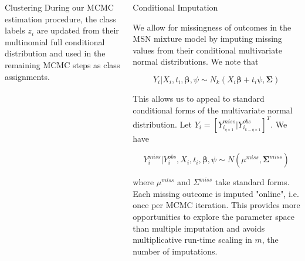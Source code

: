 \documentclass[final]{beamer}
\newlength{\onecolwid}
\newlength{\twocolwid}
\begin{document}
\begin{frame}[t]
\begin{columns}[t]
\begin{column}{\twocolwid}
\begin{columns}[t,totalwidth=\twocolwid]
\begin{column}{\onecolwid}
\begin{block}{Clustering}
During our MCMC estimation procedure, the class labels $z_i$ are updated from their multinomial full conditional distribution and used in the remaining MCMC steps as class assignments.

\end{block}


\end{column} %

\begin{column}{\onecolwid}\vspace{-.6in} %


\begin{block}{Conditional Imputation}

We allow for missingness of outcomes in the MSN mixture model by imputing missing values from their conditional multivariate normal distributions. We note that

$$Y_i|X_i,t_i,\boldsymbol\beta,\psi \sim N_k(X_i \boldsymbol\beta + t_i \psi, \boldsymbol\Sigma)$$

This allows us to appeal to standard conditional forms of the multivariate normal distribution. Let $Y_i = [Y^{miss}_{i_{q \times 1}} | Y^{obs}_{i_{k - q \times 1}}]^T$. We have

$$Y_i^{miss}|Y_i^{obs},X_i,t_i,\boldsymbol\beta,\psi \sim N(\mu^{miss},\boldsymbol\Sigma^{miss})$$

where $\mu^{miss}$ and $\Sigma^{miss}$ take standard forms. Each missing outcome is imputed "online", i.e. once per MCMC iteration. This provides more opportunities to explore the parameter space than multiple imputation and avoids multiplicative run-time scaling in $m$, the number of imputations.

\end{block}


\end{column} %

\end{columns} %


\end{column}
\end{columns}
\end{frame}
\end{document}

